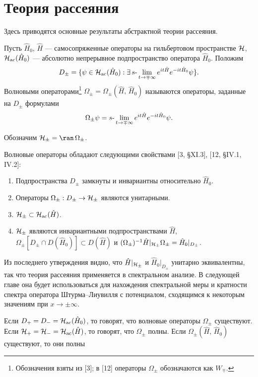 \documentclass[a4paper
]{article}
\begin{document}
\section{Теория рассеяния}
\label{scat_th}
Здесь приводятся основные результаты абстрактной теории рассеяния.
\begin{Def}
Пусть $\hat H_0$, $\hat H$ --- самосопряженные операторы на гильбертовом
пространстве ${\cal H}$, ${\cal H}_{{\rm ac}}(\hat H_0)$ --- абсолютно
непрерывное подпространство оператора $\hat H_0$. Положим
$$D_{\pm}=\{\psi\in {\cal H}_{{\rm ac}}(\hat H_0):\exists \, s{\text -}
\lim \limits_{t\rightarrow \mp \infty}e^{it\hat H}e^{-it\hat H_0}\psi\}.$$
Волновыми операторами\footnote{Обозначения взяты из [3]; в [12] операторы
$\Omega_\pm$ обозначаются как $W_{\mp}$.} $\Omega_{\pm}=\Omega_{\pm}
(\hat H, \, \hat H_0)$ называются операторы, заданные на $D_{\pm}$ формулами
$$\Omega_{\pm}\psi=s{\text -}\lim \limits_{t\rightarrow \mp \infty}
e^{it\hat H}e^{-it\hat H_0}\psi.$$
\end{Def}
Обозначим ${\cal H}_{\pm}=\ran \, \Omega_{\pm}$. \par
Волновые операторы обладают следующими свойствами [3, \S XI.3],
[12, \S IV.1, IV.2]:
\begin{enumerate}
\item Подпространства $D_{\pm}$ замкнуты и инвариантны относительно
$\hat H_0$.
\item Операторы $\Omega_{\pm}:D_{\pm}\rightarrow {\cal H}_{\pm}$ являются
унитарными.
\item ${\cal H}_{\pm}\subset {\cal H}_{{\rm ac}}(\hat H)$.
\item ${\cal H}_{\pm}$ являются инвариантными подпространствами $\hat H$,
$\Omega_{\pm}[D_{\pm}\cap D(\hat H_0)]\subset D(\hat H)$ и $(\Omega_{\pm})
^{-1}\hat H|_{{\cal H}_{\pm}}\Omega_{\pm}=\hat H_0|_{D_{\pm}}$.
\end{enumerate}
Из последнего утверждения видно, что $\hat H|_{{\cal H}_{\pm}}$ и $\hat H_0
|_{D_{\pm}}$ унитарно эквивалентны, так что теория рассеяния применяется
в спектральном анализе. В следующей главе она будет использоваться для
нахождения спектральной меры и кратности спектра оператора Штурма--Лиувилля
с потенциалом, сходящимся к некоторым значениям при $x\rightarrow \pm
\infty$. \par
Если $D_+=D_-={\cal H}_{{\rm ac}}(\hat H_0)$, то говорят, что волновые
операторы $\Omega_{\pm}$ существуют. Если ${\cal H}_+={\cal H}_-=
{\cal H}_{{\rm ac}}(\hat H)$, то говорят, что $\Omega_{\pm}$ полны.
Если $\Omega_{\pm}(\hat H, \, \hat H_0)$ существуют, то они полны
\end{document}
